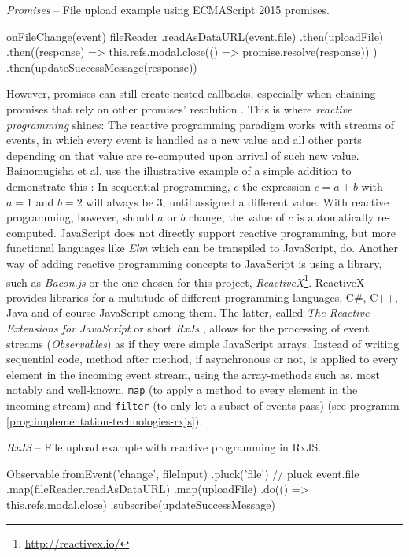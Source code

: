 \begin{program}
\caption{\emph{Promises} -- File upload example using ECMAScript 2015 promises.}
\label{prog:implementation-technologies-rxjs-promises}
\begin{JsCode}
onFileChange(event) {
  fileReader
    .readAsDataURL(event.file)
    .then(uploadFile)
    .then((response) => {
      this.refs.modal.close(() => promise.resolve(response))
    })
    .then(updateSuccessMessage(response))
}
\end{JsCode}
\end{program}

\noindent However, promises can still create nested callbacks, especially when chaining promises that rely on other promises' resolution \cite{reactive-vs-promises}. This is where \emph{reactive programming} shines: The reactive programming paradigm works with streams of events, in which every event is handled as a new value and all other parts depending on that value are re-computed upon arrival of such new value. Bainomugisha et al. use the illustrative example of a simple addition to demonstrate this \cite{reactive-programming-survey}: In sequential programming, $c$ the expression $c = a + b$ with $a = 1$ and $b = 2$ will always be $3$, until assigned a different value. With reactive programming, however, should $a$ or $b$ change, the value of $c$ is automatically re-computed.
JavaScript does not directly support reactive programming, but more functional languages like \emph{Elm} \cite{elm} which can be transpiled to JavaScript, do. Another way of adding reactive programming concepts to JavaScript is using a library, such as \emph{Bacon.js} \cite{baconjs} or the one chosen for this project, \emph{ReactiveX}\footnote{\url{http://reactivex.io/}}. ReactiveX provides libraries for a multitude of different programming languages, C#, C++, Java and of course JavaScript among them. The latter, called \emph{The Reactive Extensions for JavaScript} or short \emph{RxJs} \cite{rxjs}, allows for the processing of event streams (\emph{Observables}) as if they were simple JavaScript arrays. Instead of writing sequential code, method after method, if asynchronous or not, is applied to every element in the incoming event stream, using the array-methods such as, most notably and well-known, \texttt{map} (to apply a method to every element in the incoming stream) and \texttt{filter} (to only let a subset of events pass) (see programm \ref{prog:implementation-technologies-rxjs}).

\begin{program}
\caption{\emph{RxJS} -- File upload example with reactive programming in RxJS.}
\label{prog:implementation-technologies-rxjs}
\begin{JsCode}
Observable.fromEvent('change', fileInput)
  .pluck('file') // pluck event.file
  .map(fileReader.readAsDataURL)
  .map(uploadFile)
  .do(() => this.refs.modal.close)
  .subscribe(updateSuccessMessage)
\end{JsCode}
\end{program}

